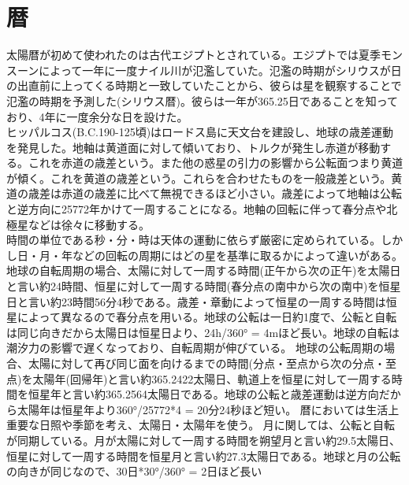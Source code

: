 \section{暦}
	太陽暦が初めて使われたのは古代エジプトとされている。エジプトでは夏季モンスーンによって一年に一度ナイル川が氾濫していた。氾濫の時期がシリウスが日の出直前に上ってくる時期と一致していたことから、彼らは星を観察することで氾濫の時期を予測した(シリウス暦)。彼らは一年が365.25日であることを知っており、4年に一度余分な日を設けた。\\
	ヒッパルコス(B.C.190-125頃)はロードス島に天文台を建設し、地球の歳差運動を発見した。地軸は黄道面に対して傾いており、トルクが発生し赤道が移動する。これを赤道の歳差という。また他の惑星の引力の影響から公転面つまり黄道が傾く。これを黄道の歳差という。これらを合わせたものを一般歳差という。黄道の歳差は赤道の歳差に比べて無視できるほど小さい。歳差によって地軸は公転と逆方向に25772年かけて一周することになる。地軸の回転に伴って春分点や北極星などは徐々に移動する。\\
    時間の単位である秒・分・時は天体の運動に依らず厳密に定められている。しかし日・月・年などの回転の周期にはどの星を基準に取るかによって違いがある。\\
    地球の自転周期の場合、太陽に対して一周する時間(正午から次の正午)を太陽日と言い約24時間、恒星に対して一周する時間(春分点の南中から次の南中)を恒星日と言い約23時間56分4秒である。歳差・章動によって恒星の一周する時間は恒星によって異なるので春分点を用いる。地球の公転は一日約1度で、公転と自転は同じ向きだから太陽日は恒星日より、24h/360° = 4mほど長い。地球の自転は潮汐力の影響で遅くなっており、自転周期が伸びている。
    地球の公転周期の場合、太陽に対して再び同じ面を向けるまでの時間(分点・至点から次の分点・至点)を太陽年(回帰年)と言い約365.2422太陽日、軌道上を恒星に対して一周する時間を恒星年と言い約365.2564太陽日である。地球の公転と歳差運動は逆方向だから太陽年は恒星年より360°/25772*4 = 20分24秒ほど短い。
	暦においては生活上重要な日照や季節を考え、太陽日・太陽年を使う。
    月に関しては、公転と自転が同期している。月が太陽に対して一周する時間を朔望月と言い約29.5太陽日、恒星に対して一周する時間を恒星月と言い約27.3太陽日である。地球と月の公転の向きが同じなので、30日*30°/360° = 2日ほど長い
